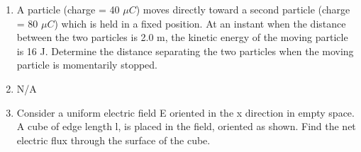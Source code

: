\documentclass{article}
\begin{document}
\begin{enumerate}
  \item A particle (charge = 40 \(\mu C\)) moves directly toward a second particle (charge = 80 \(\mu C\)) which is held in a fixed position. At an instant when the distance between the two particles is 2.0 m, the kinetic energy of the moving particle is 16 J. Determine the distance separating the two particles when the moving particle is momentarily stopped.
  \item N/A
  \item Consider a uniform electric field E oriented in the x direction in empty space. A cube of edge length l, is placed in the field, oriented as shown. Find the net electric flux through the surface of the cube.
\end{enumerate}
\end{document}
